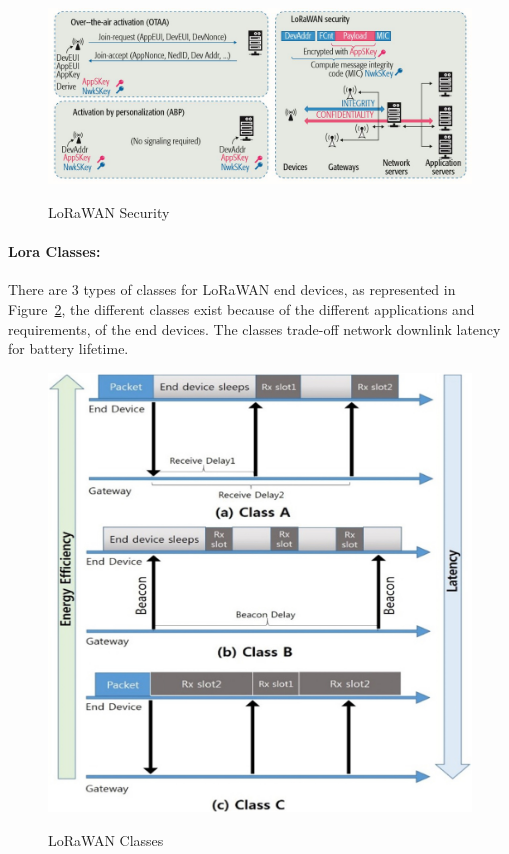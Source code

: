 \begin{figure}[ht]
  \centering
    {\includegraphics[height=2.1 in,width=0.75\linewidth]{Chapters/Figures/LoRaSecurity.JPG}}%
  \caption{LoRaWAN Security~\cite{Navarro-Ortiz2018}}
  \label{fig:lora_security}
\end{figure}



\paragraph{Lora Classes:}
\label{par: lora_classes_sota}


There are 3 types of classes for LoRaWAN end devices, as represented in Figure~\ref{fig:lora_classes}, the different classes exist because of the different applications and requirements, of the end devices. The classes trade-off network downlink latency for battery lifetime. 

\begin{figure}[htbp]
  \centering
    {\includegraphics[width=0.5\linewidth]{Chapters/Figures/loraclasses.jpg}}%
  \caption{LoRaWAN Classes~\cite{Sinha2017}}
  \label{fig:lora_classes}
\end{figure}

